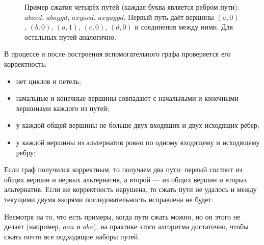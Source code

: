 \documentclass[14pt]{matmex-diploma-custom}
\begin{document}
\begin{figure}[h]
    \centering
{}
\caption{Пример сжатия четырёх путей (каждая буква является ребром пути): $abacd$, $abaggd$, $axyacd$, $axyaggd$. Первый путь даёт вершины $(a,0)$, $(b,0)$, $(a,1)$, $(c,0)$, $(d,0)$ и соединения между ними. Для остальных путей аналогично.}
\label{fig:compresed_paths}
\end{figure}

В процессе и после построения вспомогательного графа проверяется его корректность: 
\begin{itemize}
    \item нет циклов и петель;
    \item начальные и конечные вершины совпадают с начальными и конечными вершинами каждого из путей;
    \item у каждой общей вершины не больше двух входящих и двух исходящих рёбер;
    \item у каждой вершины из альтернатив ровно по одному входящему и исходящему ребру;
\end{itemize}

Если граф получился корректным, то получаем два пути: первый состоит из общих вершин и первых альтернатив, а второй --- из общих вершин и вторых альтернатив. Если же корректность нарушена, то сжать пути не удалось и между текущими двумя якорями последовательность исправлена не будет.

Несмотря на то, что есть примеры, когда пути сжать можно, но он этого не делает (например, $aaa$ и $aba$), на практике этого алгоритма достаточно, чтобы сжать почти все подходящие наборы путей.
\end{document}
